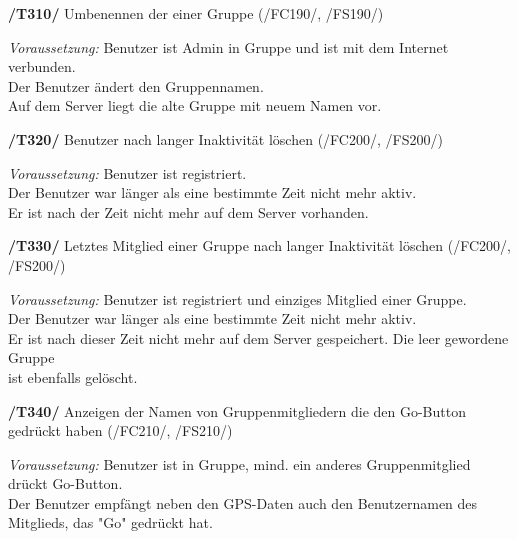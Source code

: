 \textbf{/T310/} Umbenennen der einer Gruppe (/FC190/, /FS190/)\\
\begin{center}
\vspace{-\parskip}
\begin{minipage}[t]{0.9\textwidth}
\emph{Voraussetzung:} Benutzer ist Admin in Gruppe und ist mit dem Internet verbunden.\\
Der Benutzer ändert den Gruppennamen.\\
Auf dem Server liegt die alte Gruppe mit neuem Namen vor.\\
\end{minipage}
\end{center}

\textbf{/T320/} Benutzer nach langer Inaktivität löschen (/FC200/, /FS200/)\\
\begin{center}
\vspace{-\parskip}
\begin{minipage}[t]{0.9\textwidth}
\emph{Voraussetzung:} Benutzer ist registriert.\\
Der Benutzer war länger als eine bestimmte Zeit nicht mehr aktiv.\\
Er ist nach der Zeit nicht mehr auf dem Server vorhanden.\\
\end{minipage}
\end{center}

\textbf{/T330/} Letztes Mitglied einer Gruppe nach langer Inaktivität löschen (/FC200/, /FS200/)\\
\begin{center}
\vspace{-\parskip}
\begin{minipage}[t]{0.9\textwidth}
\emph{Voraussetzung:} Benutzer ist registriert und einziges Mitglied einer Gruppe.\\
Der Benutzer war länger als eine bestimmte Zeit nicht mehr aktiv.\\
Er ist nach dieser Zeit nicht mehr auf dem Server gespeichert. Die leer gewordene Gruppe\\
ist ebenfalls gelöscht.\\
\end{minipage}
\end{center}

\textbf{/T340/} Anzeigen der Namen von Gruppenmitgliedern die den Go-Button gedrückt haben (/FC210/, /FS210/)\\
\begin{center}
\vspace{-\parskip}
\begin{minipage}[t]{0.9\textwidth}
\emph{Voraussetzung:} Benutzer ist in Gruppe, mind. ein anderes Gruppenmitglied drückt Go-Button.\\
Der Benutzer empfängt neben den GPS-Daten auch den Benutzernamen des Mitglieds, das "Go" gedrückt hat.\\
\end{minipage}
\end{center}

